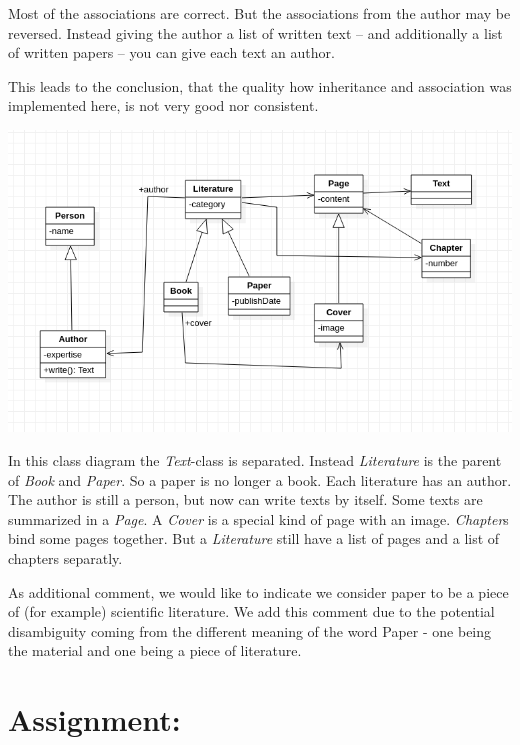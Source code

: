 \documentclass[a4paper,12pt,oneside]{scrreprt}
\begin{document}
    Most of the associations are correct. But the associations from the author may be reversed. Instead giving the author a list of written text -- and additionally a list of written papers -- you can give each text an author.
    
    This leads to the conclusion, that the quality how inheritance and
    association was implemented here, is not very good nor consistent.
    
    \includegraphics[width=\textwidth]{../uml/2_2.png}
    
    In this class diagram the \textit{Text}-class is separated. Instead \textit{Literature} is the parent of \textit{Book} and \textit{Paper}. So a paper is no longer a book. Each literature has an author. The author is still a person, but now can write texts by itself. Some texts are summarized in a \textit{Page}. A \textit{Cover} is a special kind of page with an image. \textit{Chapter}s bind some pages together. But a \textit{Literature} still have a list of pages and a list of chapters separatly.
    
    As additional comment, we would like to indicate we consider paper to be a piece of (for example) scientific literature. We add this comment due to the potential disambiguity coming from the different meaning of the word Paper - one being the material and one being a piece of literature. 
    
	\section{Assignment:}
    
\end{document}
